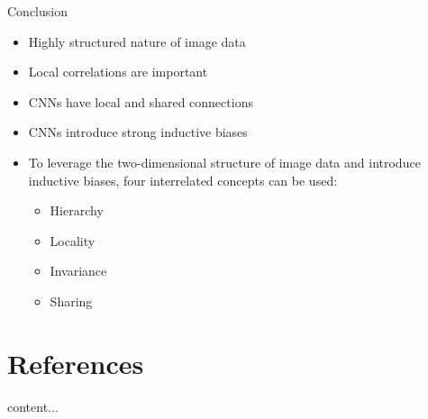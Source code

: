 \documentclass[default, aspectratio=169]{beamer}
\begin{document}
	
	\begin{frame}{Conclusion}
		
		\begin{itemize}
			\item Highly structured nature of image data
			\item Local correlations are important
			\item CNNs have local and shared connections
			\item CNNs introduce strong inductive biases
			\item To leverage the two-dimensional structure of image data and introduce inductive biases, four interrelated concepts can be used:
			\begin{itemize}
				\item Hierarchy
				\item Locality
				\item Invariance 
				\item Sharing
			\end{itemize}
		\end{itemize}
		
	\end{frame}
	
	\section{References}
	\begin{frame}
		content...
	\end{frame}
	
	
	
\end{document}
